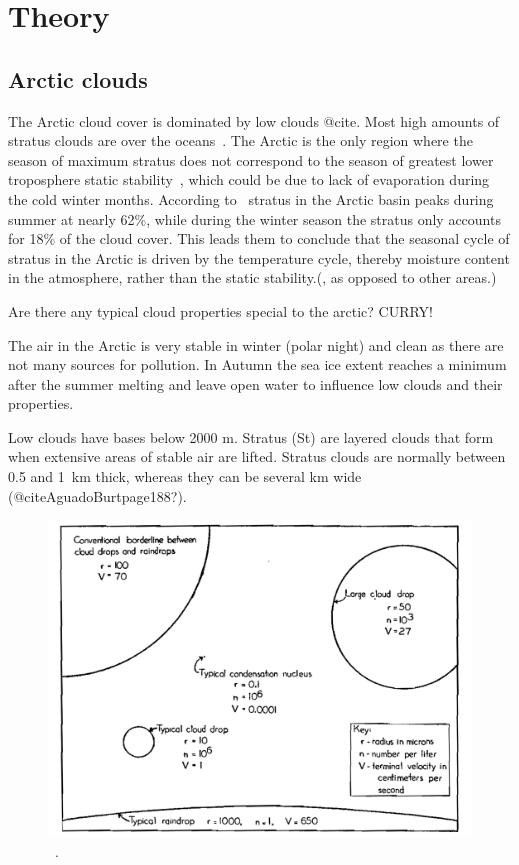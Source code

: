 \chapter{Theory}
\label{chap:theory}
\section{Arctic clouds}
The Arctic cloud cover is dominated by low clouds @cite. Most high amounts of stratus clouds are over the oceans~\citep{Klein1993}. The Arctic is the only region where the season of maximum stratus does not correspond to the season of greatest lower troposphere static stability~\citep{Klein1993}, which could be due to lack of evaporation during the cold winter months. According to~\cite{Klein1993} stratus in the Arctic basin peaks during summer at nearly 62\%, while during the winter season the stratus only accounts for 18\% of the cloud cover. This leads them to conclude that the seasonal cycle of stratus in the Arctic is driven by the temperature cycle, thereby moisture content in the atmosphere, rather than the static stability.(, as opposed to other areas.)

Are there any typical cloud properties special to the arctic? CURRY!

The air in the Arctic is very stable in winter (polar night) and clean as there are not many sources for pollution. In Autumn the sea ice extent reaches a minimum after the summer melting and leave open water to influence low clouds and their properties. 

Low clouds have bases below 2000 m. Stratus (St) are layered clouds that form when extensive areas of stable air are lifted. Stratus clouds are normally between 0.5 and 1~km thick, whereas they can be several km wide (@citeAguadoBurtpage188?).

\begin{figure}
\includegraphics[width=1\textwidth]{dropletsize}
\caption{~\citep{McDonald1958}.}
\label{fig:Schf01}
\end{figure}
 

